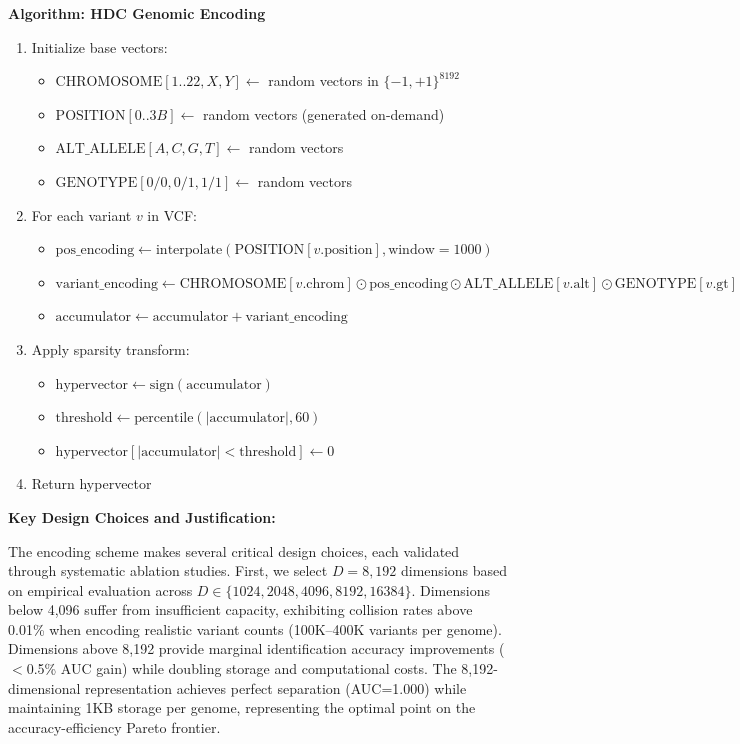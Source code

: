 \documentclass[11pt,letterpaper]{article}
\begin{document}
\textbf{Algorithm: HDC Genomic Encoding}
\begin{enumerate}
\item Initialize base vectors:
  \begin{itemize}
  \item $\text{CHROMOSOME}[1..22,X,Y] \leftarrow$ random vectors in $\{-1,+1\}^{8192}$
  \item $\text{POSITION}[0..3B] \leftarrow$ random vectors (generated on-demand)
  \item $\text{ALT\_ALLELE}[A,C,G,T] \leftarrow$ random vectors
  \item $\text{GENOTYPE}[0/0, 0/1, 1/1] \leftarrow$ random vectors
  \end{itemize}
\item For each variant $v$ in VCF:
  \begin{itemize}
  \item $\text{pos\_encoding} \leftarrow \text{interpolate}(\text{POSITION}[v.\text{position}], \text{window}=1000)$
  \item $\text{variant\_encoding} \leftarrow \text{CHROMOSOME}[v.\text{chrom}] \odot \text{pos\_encoding} \odot \text{ALT\_ALLELE}[v.\text{alt}] \odot \text{GENOTYPE}[v.\text{gt}]$
  \item $\text{accumulator} \leftarrow \text{accumulator} + \text{variant\_encoding}$
  \end{itemize}
\item Apply sparsity transform:
  \begin{itemize}
  \item $\text{hypervector} \leftarrow \text{sign}(\text{accumulator})$
  \item $\text{threshold} \leftarrow \text{percentile}(|\text{accumulator}|, 60)$
  \item $\text{hypervector}[|\text{accumulator}| < \text{threshold}] \leftarrow 0$
  \end{itemize}
\item Return hypervector
\end{enumerate}

\textbf{Key Design Choices and Justification:}

The encoding scheme makes several critical design choices, each validated through systematic ablation studies. First, we select $D=8,192$ dimensions based on empirical evaluation across $D \in \{1024, 2048, 4096, 8192, 16384\}$. Dimensions below 4,096 suffer from insufficient capacity, exhibiting collision rates above 0.01\% when encoding realistic variant counts (100K--400K variants per genome). Dimensions above 8,192 provide marginal identification accuracy improvements ($<$0.5\% AUC gain) while doubling storage and computational costs. The 8,192-dimensional representation achieves perfect separation (AUC=1.000) while maintaining 1KB storage per genome, representing the optimal point on the accuracy-efficiency Pareto frontier.
\end{document}
